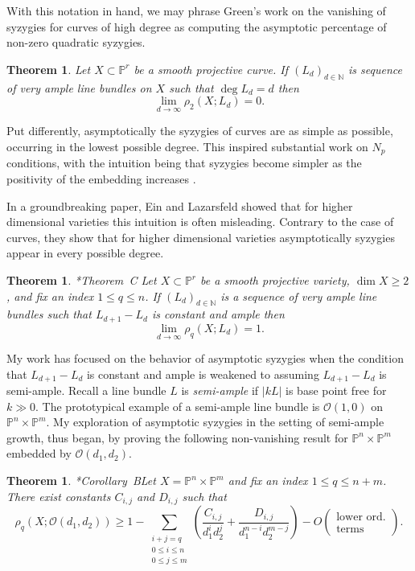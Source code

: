 \documentclass[11pt,reqno]{amsart}
\newtheorem{theorem}[lemma]{Theorem}
\theoremstyle{remark}
\renewcommand{\O}{\mathcal{O}}
\newcommand{\N}{\mathbb{N}}
\renewcommand{\P}{\mathbb{P}}
\begin{document}
With this notation in hand, we may phrase Green's work on the vanishing of syzygies for curves of high degree as computing the asymptotic percentage of non-zero quadratic syzygies. 

\begin{theorem}\cite{green84-I}
Let $X\subset \P^r$ be a smooth projective curve. If $(L_{d})_{d\in\N}$ is sequence of very ample line bundles on $X$ such that $\deg L_{d} = d$ then 
\[
\lim_{d\to \infty} \rho_{2}\left(X;L_{d}\right) = 0.
\]
\end{theorem}

Put differently, asymptotically the syzygies of curves are as simple as possible, occurring in the lowest possible degree. This inspired substantial work on $N_{p}$ conditions, with the intuition being that syzygies become simpler as the positivity of the embedding increases \cite{ottavianiPaoletti01, einLazarsfeld93, lazarsfeldPareschiPopa11, pareschi00, pareschiPopa03, pareschiPopa04}.  

In a groundbreaking paper, Ein and Lazarsfeld showed that for higher dimensional varieties this intuition is often misleading. Contrary to the case of curves, they show that for higher dimensional varieties  asymptotically syzygies appear in every possible degree. 
  
\begin{theorem}\cite{einLazarsfeld12}*{Theorem~C}
Let $X\subset \P^r$ be a smooth projective variety, $\dim X \geq2$, and fix an index $1\leq q \leq n$. If $(L_{d})_{d\in\N}$ is a sequence of very ample line bundles such that $L_{d+1}-L_{d}$ is constant and ample then
\[
\lim_{d\to\infty} \rho_{q}\left(X; L_d\right) = 1.
\]
\end{theorem}

My work has focused on the behavior of asymptotic syzygies when the condition that $L_{d+1}-L_{d}$ is constant and ample is weakened to assuming $L_{d+1}-L_{d}$ is semi-ample. Recall a line bundle $L$ is \textit{semi-ample} if $|kL|$ is base point free for $k\gg0$. The prototypical example of a semi-ample line bundle is $\O(1,0)$ on $\P^{n}\times \P^{m}$. My exploration of asymptotic syzygies in the setting of semi-ample growth, thus began, by proving the following non-vanishing result for $\P^{n}\times\P^{m}$ embedded by $\O(d_{1},d_{2})$. 

\begin{theorem}\cite{bruce19-semiample}*{Corollary~B}\label{thm:bruce-semiample}
Let $X=\P^{n}\times\P^{m}$ and fix an index $1\leq q \leq n+m$. There exist constants $C_{i,j}$ and $D_{i,j}$ such that
\[
\rho_{q}\left(X; \O\left(d_1,d_2\right)\right)\geq1-\sum_{\substack{i+j=q \\ 0\leq i \leq n \\ 0\leq j \leq m}}\left(
\frac{C_{i,j}}{d_1^id_2^j}+\frac{D_{i,j}}{d_1^{n-i}d_2^{m-j}}\right)-O\left(\begin{matrix}\text{lower ord.}\\ \text{terms}\end{matrix}\right).
\]
\end{theorem}
\end{document}
